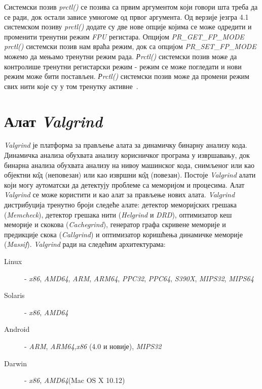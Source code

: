 \documentclass[12pt,oneside]{memoir}
\begin{document}
\indent Системски позив \textit{prctl()} се позива са првим аргументом који говори шта треба да се ради, док остали зависе умногоме од првог аргумента. Од верзије језгра 4.1 системском позиву \textit{prctl()} додате су две нове опције којима се може одредити и променити тренутни режим \textit{FPU} регистара.  Опцијом \textit{PR\_GET\_FP\-\_MODE} \textit{prctl()} системски позив нам враћа режим, док са опцијом \textit{PR\_SET\_FP\-\_MODE} можемо да мењамо тренутни режим рада. \textit{Рrctl()} системски позив може да контролише тренутни регистарски режим - режим се може погледати и нови режим може бити постављен. \textit{Рrctl()} системски позив може да промени режим свих нити које су у том тренутку активне~\cite{prctlRef}.


\chapter{Алат \textit{Valgrind}}
\label{chp:valgrind}

\indent \textit{Valgrind} је платформа за прављење алата за динамичку бинарну анализу кода. Динамичка анализа обухвата анализу корисничког програма у извршавању, док бинарна анализа обухвата анализу на нивоу машинског кода, снимљеног или као објектни к\^{о}д (неповезан) или као извршни к\^{о}д (повезан). Постоје \textit{Valgrind} алати који могу аутоматски да детектују проблеме са меморијом и процесима. Алат \textit{Valgrind} се може користити и као алат за прављење нових алата. \textit{Valgrind} дистрибуција тренутно броји следеће алате: детектор меморијских грешака (\textit{Memcheck}), детектор грешака нити (\textit{Helgrind} и \textit{DRD}), оптимизатор кеш меморије и скокова (\textit{Cachegrind}), генератор графа скривене меморије и предикције скока (\textit{Callgrind}) и оптимизатор коришћења динамичке меморије (\textit{Massif}). \textit{Valgrind} ради на следећим архитектурама:
\begin{description}
	\item[Linux] - \textit{x86}, \textit{AMD64}, \textit{ARM}, \textit{ARM64}, \textit{PPC32}, \textit{PPC64}, \textit{S390X}, \textit{MIPS32}, \textit{MIPS64}
	\item[Solaris] - \textit{x86}, \textit{AMD64}
	\item[Android] - \textit{ARM}, \textit{ARM64},\textit{x86} (4.0 и новије), \textit{MIPS32}
	\item[Darwin] - \textit{x86}, \textit{AMD64}(Mac OS X 10.12)
\end{description}
\end{document}
